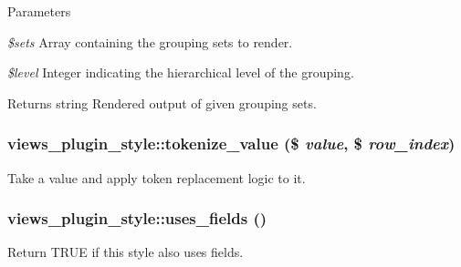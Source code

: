 \begin{DoxyParams}{Parameters}
\item[{\em \$sets}]Array containing the grouping sets to render. \item[{\em \$level}]Integer indicating the hierarchical level of the grouping.\end{DoxyParams}
\begin{DoxyReturn}{Returns}
string Rendered output of given grouping sets. 
\end{DoxyReturn}
\hypertarget{classviews__plugin__style_a64c88c0e4d26997edce0478df01983c0}{
\subsubsection[{tokenize\_\-value}]{\setlength{\rightskip}{0pt plus 5cm}views\_\-plugin\_\-style::tokenize\_\-value (\$ {\em value}, \/  \$ {\em row\_\-index})}}
\label{classviews__plugin__style_a64c88c0e4d26997edce0478df01983c0}
Take a value and apply token replacement logic to it. \hypertarget{classviews__plugin__style_a04c6419f4049b7e2644904b5089f2e41}{
\subsubsection[{uses\_\-fields}]{\setlength{\rightskip}{0pt plus 5cm}views\_\-plugin\_\-style::uses\_\-fields ()}}
\label{classviews__plugin__style_a04c6419f4049b7e2644904b5089f2e41}
Return TRUE if this style also uses fields.

